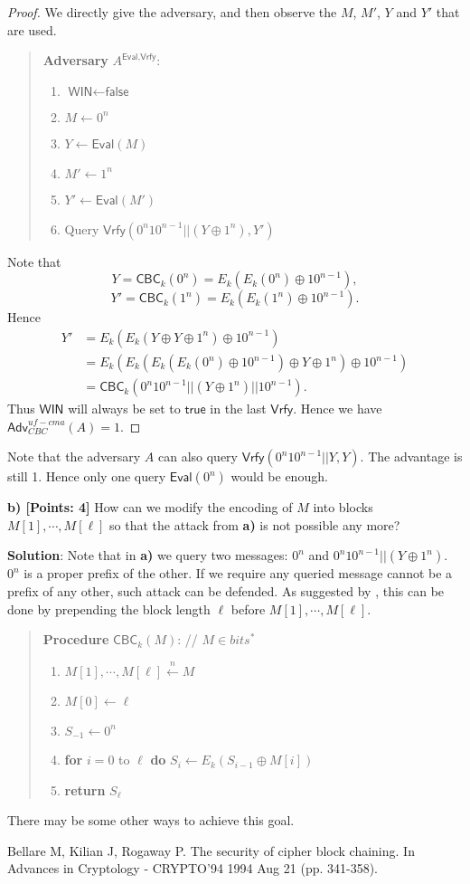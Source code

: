 \documentclass[12pt]{article}
\newcommand{\getsn}{\stackrel{n}{\gets}}
\newcommand{\Adv}{\textsf{Adv}}
\newcommand{\CBC}{\textsf{CBC}}
\newcommand{\Eval}{\textsf{Eval}}
\newcommand{\Vrfy}{\textsf{Vrfy}}
\newcommand{\WIN}{\textsf{WIN}}
\newcommand{\true}{\textsf{true}}
\newcommand{\false}{\textsf{false}}
\theoremstyle{definition}
\begin{document}
\begin{proof}
We directly give the adversary, and then observe the $M$, $M'$, $Y$ and $Y'$ that are used.
\begin{quote}
{\bf Adversary} $A^{\Eval, \Vrfy}$:
\begin{enumerate}
\item $\WIN \gets \false$
\item $M \gets 0^n$
\item $Y \gets \Eval(M)$
\item $M' \gets 1^n$
\item $Y' \gets \Eval(M')$
\item Query $\Vrfy(0^n10^{n-1}||(Y \oplus 1^n), Y')$
\end{enumerate}
\end{quote}
Note that 
$$Y = \CBC_k (0^n) = E_k(E_k(0^n) \oplus 10^{n-1}),$$
$$Y' = \CBC_k (1^n) = E_k(E_k(1^n) \oplus 10^{n-1}).$$
Hence
$$\begin{aligned}
Y' &= E_k(E_k(Y \oplus Y \oplus 1^n) \oplus 10^{n-1}) \\
&= E_k(E_k(E_k(E_k(0^n) \oplus 10^{n-1}) \oplus Y \oplus 1^n) \oplus 10^{n-1}) \\
&= \CBC_k (0^n10^{n-1} || (Y \oplus 1^n) || 10^{n-1}).
\end{aligned}$$
Thus $\WIN$ will always be set to $\true$ in the last $\Vrfy$. Hence we have $\Adv_{CBC}^{uf-cma}(A) = 1$.
\end{proof}
Note that the adversary $A$ can also query $\Vrfy(0^n10^{n-1}||Y, Y)$. The advantage is still 1. Hence only one query $\Eval(0^n)$ would be enough.

{\bf b) [Points: 4]} How can we modify the encoding of $M$ into blocks
$M[1], \cdots, M[\ell]$ so that the attack from {\bf a)} is not possible any more?

{\bf Solution}: Note that in {\bf a)} we query two messages: $0^n$ and $0^n10^{n-1}||(Y \oplus 1^n)$. $0^n$ is a proper prefix of the other. If we require any queried message cannot be a prefix of any other, such attack can be defended. As suggested by \cite{BKR94}, this can be done by prepending the block length $\ell$ before $M[1], \cdots, M[\ell]$.
\begin{quote}
{\bf Procedure} $\CBC_k (M)$: // $M \in bits^*$
\begin{enumerate}
\item $M[1], \cdots, M[\ell] \getsn M$
\item $M[0] \gets \ell$
\item $S_{-1} \gets 0^n$
\item {\bf for} $i=0$ to $\ell$ {\bf do} $S_i \gets E_k (S_{i-1} \oplus M[i])$
\item {\bf return} $S_{\ell}$
\end{enumerate}
\end{quote}
There may be some other ways to achieve this goal.

\begin{thebibliography}{10}
Bellare M, Kilian J, Rogaway P. The security of cipher block chaining. In Advances in Cryptology - CRYPTO’94 1994 Aug 21 (pp. 341-358).
\end{thebibliography}
\end{document}
